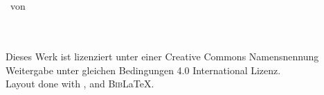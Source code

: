 \maketitle

\begin{titlepage}
\centering
{\huge \titel}\bigskip\\  
{\Large \untertitel}\bigskip\\
{\large \thesisname\ von\ \authorname}\bigskip\\
\begin{abstract}
\warn{\blindtext}
\end{abstract}
\par\vfill
\authorname \bigskip\\
\ccbysa\\
Dieses Werk ist lizenziert unter einer Creative Commons Namensnennung\\
Weitergabe unter gleichen Bedingungen 4.0 International Lizenz.\bigskip\\
Layout done with {\rmfamily \LaTeXe}, {\sffamily \KOMAScript} and {\rmfamily B\textsc{ib}\LaTeX}.
\end{titlepage}
\clearpage
